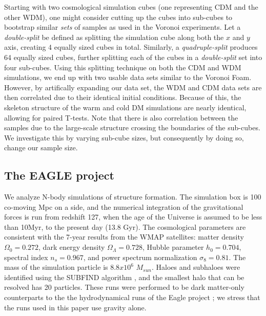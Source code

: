 \documentclass[12pt]{article}
\begin{document}
Starting with two cosmological simulation cubes (one representing CDM and the other WDM), one might consider cutting up the cubes into sub-cubes to bootstrap similar \emph{sets} of samples as used in the Voronoi experiments. Let a \textit{double-split} be defined as splitting the simulation cube along both the $x$ and $y$ axis, creating 4 equally sized cubes in total. Similarly, a \textit{quadruple-split} produces 64 equally sized cubes, further splitting each of the cubes in a \textit{double-split} set into four sub-cubes. Using this splitting technique on both the CDM and WDM simulations, we end up with two usable data sets similar to the Voronoi Foam. However, by artifically expanding our data set, the WDM and CDM data sets are then correlated due to their identical initial conditions. Because of this, the skeleton structure of the warm and cold DM simulations are nearly identical, allowing for paired T-tests. Note that there is also correlation between the samples due to the large-scale structure crossing the boundaries of the sub-cubes. We investigate this by varying sub-cube sizes, but consequently by doing so, change our sample size.

\subsection{The EAGLE project}
We analyze N-body simulations of structure formation. The simulation box is 100 co-moving Mpc on a side, and the numerical integration of the gravitational forces is run from redshift 127, when the age of the Universe is assumed to be less than 10Myr, to the present day (13.8 Gyr). The cosmological parameters are consistent with the 7-year results from the WMAP satellites: matter density $\Omega_0 = 0.272$, dark energy density $\Omega_{\Lambda} = 0.728$, Hubble parameter $h_0 = 0.704$, spectral index $n_s=0.967$, and power spectrum normalization $\sigma_8=0.81$. The mass of the simulation particle is $8.8x10^6$ $M_{sun}$. Haloes and subhaloes were identified using the SUBFIND algorithm \citep{springel2001populating}, and the smallest halo that can be resolved has 20 particles. These runs were performed to be dark matter-only counterparts to the the hydrodynamical runs of the Eagle project \citep{schaye2015eagle}; we stress that the runs used in this paper use gravity alone.
\end{document}
